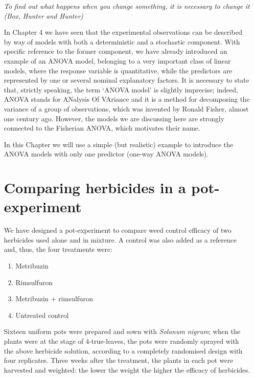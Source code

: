 \documentclass[a4paper,12pt,oneside]{book}
\providecommand{\tightlist}{%
  \setlength{\itemsep}{0pt}\setlength{\parskip}{0pt}}
\begin{document}
\emph{To find out what happens when you change something, it is necessary to change it (Box, Hunter and Hunter)}

In Chapter 4 we have seen that the experimental observations can be described by way of models with both a deterministic and a stochastic component. With specific reference to the former component, we have already introduced an example of an ANOVA model, belonging to a very important class of linear models, where the response variable is quantitative, while the predictors are represented by one or several nominal explanatory factors. It is necessary to state that, strictly speaking, the term `ANOVA model' is slightly imprecise; indeed, ANOVA stands for ANalysis Of VAriance and it is a method for decomposing the variance of a group of observations, which was invented by Ronald Fisher, almost one century ago. However, the models we are discussing here are strongly connected to the Fisherian ANOVA, which motivates their name.

In this Chapter we will use a simple (but realistic) example to introduce the ANOVA models with only one predictor (one-way ANOVA models).

\hypertarget{comparing-herbicides-in-a-pot-experiment}{%
\section{Comparing herbicides in a pot-experiment}\label{comparing-herbicides-in-a-pot-experiment}}

We have designed a pot-experiment to compare weed control efficacy of two herbicides used alone and in mixture. A control was also added as a reference and, thus, the four treatments were:

\begin{enumerate}
\def\labelenumi{\arabic{enumi}.}
\tightlist
\item
  Metribuzin
\item
  Rimsulfuron
\item
  Metribuzin + rimsulfuron
\item
  Untreated control
\end{enumerate}

Sixteen uniform pots were prepared and sown with \emph{Solanum nigrum}; when the plants were at the stage of 4-true-leaves, the pots were randomly sprayed with the above herbicide solution, according to a completely randomised design with four replicates. Three weeks after the treatment, the plants in each pot were harvested and weighted: the lower the weight the higher the efficacy of herbicides.
\end{document}
